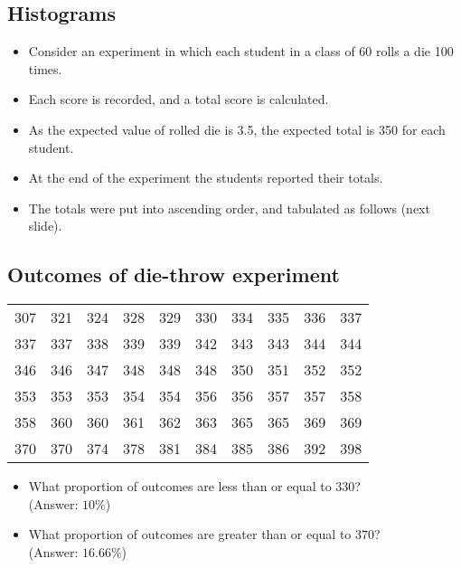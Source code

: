\documentclass[]{report}
\begin{document}
{
\subsection{Histograms}
\begin{itemize}
\item Consider an experiment in which each student in a class of 60 rolls a die 100 times.
\item Each score is recorded, and a total score is calculated.
\item As the expected value of rolled die is 3.5, the expected total is 350 for each student.
\item At the end of the experiment the students reported their totals.
\item The totals were put into ascending order, and tabulated as follows (next slide).
\end{itemize}

}

{
\subsection{Outcomes of die-throw experiment}
\small
\begin{center}
\begin{tabular}{|c c c c c c c c c c|}
\hline
307 & 321 & 324 & 328 & 329 & 330 & 334 & 335 & 336 &337 \\
337 & 337 & 338 & 339 & 339 & 342 & 343 & 343 & 344 &344 \\
346 & 346 & 347 & 348 & 348 & 348 & 350 & 351 & 352 &352 \\
353 & 353 & 353 & 354 & 354 & 356 & 356 & 357 & 357 &358 \\
358 & 360 & 360 & 361 & 362 & 363 & 365 & 365 & 369 &369 \\
370 & 370 & 374 & 378 & 381 & 384 & 385 & 386 & 392 &398 \\
\hline
\end{tabular}
\end{center}
\normalsize
\begin{itemize}
\item What proportion of outcomes are less than or equal to 330? \\ (Answer: $10\%$)
\item What proportion of outcomes are greater than or equal to 370?\\ (Answer: $16.66\%$)
\end{itemize}
}
\end{document}
